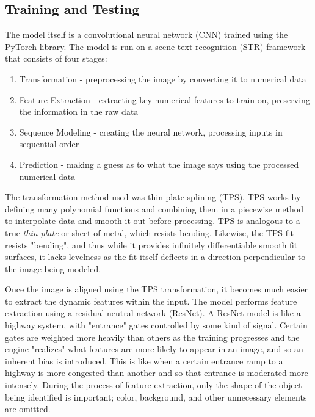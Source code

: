 \documentclass[12pt, two column, letterpaper]{article}
\begin{document}
\subsection{Training and Testing}
The model itself is a convolutional neural network (CNN) trained using the PyTorch library. The model is run on a scene
text recognition (STR) framework that consists of four stages:
\begin{enumerate}
    \item Transformation - preprocessing the image by converting it to numerical data
    \item Feature Extraction - extracting key numerical features to train on, preserving the information in the raw data
    \item Sequence Modeling - creating the neural network, processing inputs in sequential order
    \item Prediction - making a guess as to what the image says using the processed numerical data
\end{enumerate}
The transformation method used was thin plate splining (TPS). TPS works by defining many polynomial functions and
combining them in a piecewise method to interpolate data and smooth it out before processing. TPS is analogous to a
true \textit{thin plate} or sheet of metal, which resists bending. Likewise, the TPS fit resists "bending", and thus
while it provides infinitely differentiable smooth fit surfaces, it lacks levelness as the fit itself deflects in a
direction perpendicular to the image being modeled.

Once the image is aligned using the TPS transformation, it becomes much easier to extract the dynamic features within the input. The model performs feature extraction using a residual neutral network (ResNet). A ResNet model is like a highway system, with "entrance" gates controlled by some kind of signal. Certain gates are weighted more heavily than others as the training progresses and the engine "realizes" what features are more likely to appear in an image, and so an inherent bias is introduced. This is like when a certain entrance ramp to a highway is more congested than another and so that entrance is moderated more intensely. During the process of feature extraction, only the shape of the object being identified is important; color, background, and other unnecessary elements are omitted.
\end{document}
